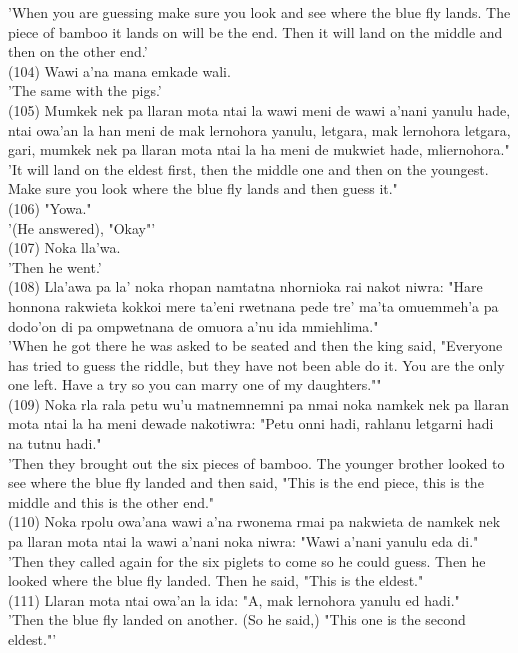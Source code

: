 \documentclass[10pt]{article}
\begin{document}
'When you are guessing make sure you look and see where the blue fly lands. The piece of bamboo it lands on will be the end. Then it will land on the middle and then on the other end.'\\
(104) Wawi a'na mana emkade wali.\\
'The same with the pigs.'\\
(105) Mumkek nek pa llaran mota ntai la wawi meni de wawi a'nani yanulu hade, ntai owa'an la han meni de mak lernohora yanulu, letgara, mak lernohora letgara, gari, mumkek nek pa llaran mota ntai la ha meni de mukwiet hade, mliernohora."\\
'It will land on the eldest first, then the middle one and then on the youngest. Make sure you look where the blue fly lands and then guess it."\\
(106) "Yowa."\\
'(He answered), "Okay"'\\
(107) Noka lla'wa.\\
'Then he went.'\\
(108) Lla'awa pa la' noka rhopan namtatna nhornioka rai nakot niwra: "Hare honnona rakwieta kokkoi mere ta'eni rwetnana pede tre' ma'ta omuemmeh'a pa dodo'on di pa ompwetnana de omuora a'nu ida mmiehlima."\\
'When he got there he was asked to be seated and then the king said, "Everyone has tried to guess the riddle, but they have not been able do it. You are the only one left. Have a try so you can marry one of my daughters.""\\
(109) Noka rla rala petu wu'u matnemnemni pa nmai noka namkek nek pa llaran mota ntai la ha meni dewade nakotiwra: "Petu onni hadi, rahlanu letgarni hadi na tutnu hadi."\\
'Then they brought out the six pieces of bamboo. The younger brother looked to see where the blue fly landed and then said, "This is the end piece, this is the middle and this is the other end."\\
(110) Noka rpolu owa'ana wawi a'na rwonema rmai pa nakwieta de namkek nek pa llaran mota ntai la wawi a'nani noka niwra: "Wawi a'nani yanulu eda di."\\
'Then they called again for the six piglets to come so he could guess. Then he looked where the blue fly landed. Then he said, "This is the eldest."\\
(111) Llaran mota ntai owa'an la ida: "A, mak lernohora yanulu ed hadi."\\
'Then the blue fly landed on another. (So he said,) "This one is the second eldest."'\\
\end{document}
